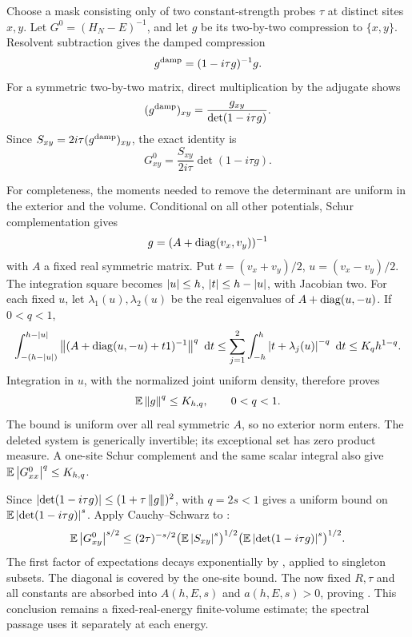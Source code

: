 Choose a mask consisting only of two constant-strength probes
\(\tau\) at distinct sites \(x,y\). Let
\(G^0=(H_N-E)^{-1}\), and let \(g\) be its two-by-two compression to
\(\{x,y\}\). Resolvent subtraction gives the damped compression
\[
                    g^{\rm damp}=(1-i\tau g)^{-1}g.
\]
For a symmetric two-by-two matrix, direct multiplication by the
adjugate shows
\[
 (g^{\rm damp})_{xy}
       =\frac{g_{xy}}{\det(1-i\tau g)}.
\]
Since \(S_{xy}=2i\tau(g^{\rm damp})_{xy}\), the exact identity is
\begin{equation}\label{boot:endpoint-identity}
          G^0_{xy}=\frac{S_{xy}}{2i\tau}\det(1-i\tau g).
\end{equation}

For completeness, the moments needed to remove the determinant are
uniform in the exterior and the volume. Conditional on all other
potentials, Schur complementation gives
\[
                    g=(A+\operatorname{diag}(v_x,v_y))^{-1}
\]
with \(A\) a fixed real symmetric matrix. Put
\(t=(v_x+v_y)/2\), \(u=(v_x-v_y)/2\). The integration square becomes
\(\left\lvert u\right\rvert\le h\), \(\left\lvert t\right\rvert\le h-\left\lvert u\right\rvert\), with Jacobian two.
For each fixed \(u\), let \(\lambda_1(u),\lambda_2(u)\) be the real
eigenvalues of \(A+\operatorname{diag}(u,-u)\). If \(0<q<1\),
\[
 \int_{-(h-\left\lvert u\right\rvert)}^{h-\left\lvert u\right\rvert}
       \left\lVert(A+\operatorname{diag}(u,-u)+t1)^{-1}\right\rVert^q\,\,\mathrm d t
 \le\sum_{j=1}^2\int_{-h}^h\left\lvert t+\lambda_j(u)\right\rvert^{-q}\,\,\mathrm d t
 \le K_q h^{1-q}.
\]
Integration in \(u\), with the normalized joint uniform density,
therefore proves
\begin{equation}\label{boot:two-site}
                    \mathbb E\left\lVert g\right\rVert^q\le K_{h,q},\qquad 0<q<1.
\end{equation}
The bound is uniform over all real symmetric \(A\), so no exterior
norm enters. The deleted system is generically invertible; its
exceptional set has zero product measure. A one-site Schur complement
and the same scalar integral also give
\(\mathbb E\left\lvert G^0_{xx}\right\rvert^q\le K_{h,q}\).

Since \(\left\lvert\det(1-i\tau g)\right\rvert\le(1+\tau\left\lVert g\right\rVert)^2\),
 with \(q=2s<1\) gives a uniform bound on
\(\mathbb E\left\lvert\det(1-i\tau g)\right\rvert^s\). Apply Cauchy--Schwarz to
:
\[
 \mathbb E\left\lvert G^0_{xy}\right\rvert^{s/2}
 \le(2\tau)^{-s/2}
       \bigl(\mathbb E\left\lvert S_{xy}\right\rvert^s\bigr)^{1/2}
       \bigl(\mathbb E\left\lvert\det(1-i\tau g)\right\rvert^s\bigr)^{1/2}.
\]
The first factor of expectations decays exponentially by
, applied to singleton subsets. The diagonal is
covered by the one-site bound. The now fixed \(R,\tau\) and all
constants are absorbed into \(A(h,E,s)\) and \(a(h,E,s)>0\), proving
. This conclusion remains a fixed-real-energy
finite-volume estimate; the spectral passage uses it separately at
each energy.
